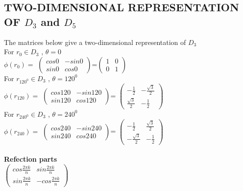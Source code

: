 \documentclass{article}
\begin{document}
\subsection{TWO-DIMENSIONAL REPRESENTATION OF $D_3$ and $D_5$}

\Large{The matrices below give a two-dimensional representation of $D_3$ }\\

For $r_0 \in D_3$ , $\theta = 0$\\

$\phi(r_0) =  $ 
$\begin{pmatrix}
    cos 0 & -sin 0\\
    sin 0 & cos 0
\end{pmatrix}$=$\begin{pmatrix}
    1& 0\\
    0 & 1
\end{pmatrix}$\\

For $r_{120^0} \in D_3$ , $\theta = 120^0$\\

$\phi(r_{120}) =  $ 
$\begin{pmatrix}
    cos 120 & -sin 120\\
    sin 120 & cos 120
\end{pmatrix}$=
$\begin{pmatrix}
   - \frac{1}{2}& -\frac{\sqrt{3}}{2}\\
    \frac{\sqrt{3}}{2} & - \frac{1}{2}
\end{pmatrix}$
\\

For $r_{240^0} \in D_3$ , $\theta = 240^0$\\

$\phi(r_{240}) =  $ 
$\begin{pmatrix}
    cos 240 & -sin 240\\
    sin 240 & cos 240
\end{pmatrix}$=
$\begin{pmatrix}
   - \frac{1}{2}& \frac{\sqrt{3}}{2}\\
    -\frac{\sqrt{3}}{2} & - \frac{1}{2}
\end{pmatrix}$
\\\\

\textbf{Refection parts}\\

$\begin{pmatrix}
    cos \frac{2\pi k}{n} & sin\frac{2\pi k}{n}\\
    sin \frac{2\pi k}{n} & -cos \frac{2\pi k}{n}
\end{pmatrix}$\\\\
\end{document}
